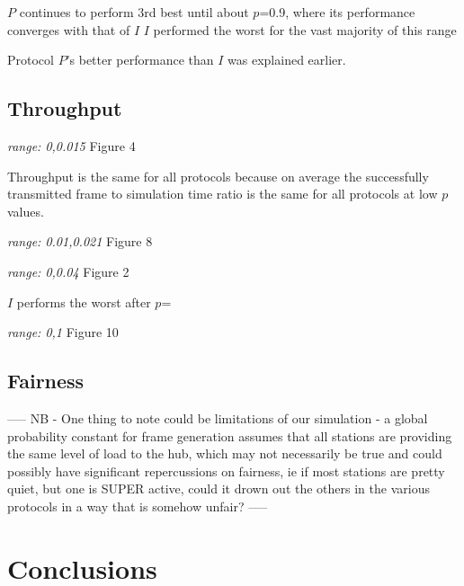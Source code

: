 \documentclass[twocolumn]{article}
\begin{document}
$P$ continues to perform 3rd best until about $p$=0.9, where its performance converges with that of $I$
$I$ performed the worst for the vast majority of this range

Protocol $P$'s better performance than $I$ was explained earlier. 

\subsection*{Throughput}

\emph{range: 0,0.015} Figure 4

Throughput is the same for all protocols because on average the successfully transmitted frame to simulation time ratio is the same
for all protocols at low $p$ values. 

\emph{range: 0.01,0.021} Figure 8



\emph{range: 0,0.04} Figure 2

$I$ performs the worst after $p$=

\emph{range: 0,1} Figure 10



\subsection*{Fairness}

-----
NB -
One thing to note could be limitations of our simulation - a global probability constant 
for frame generation assumes that all stations are providing the same level of load to 
the hub, which may not necessarily be true and could possibly have significant
repercussions on fairness, ie if most stations are pretty quiet, but one is SUPER active,
could it drown out the others in the various protocols in a way that is somehow unfair?
-----

\section*{Conclusions}
\end{document}
